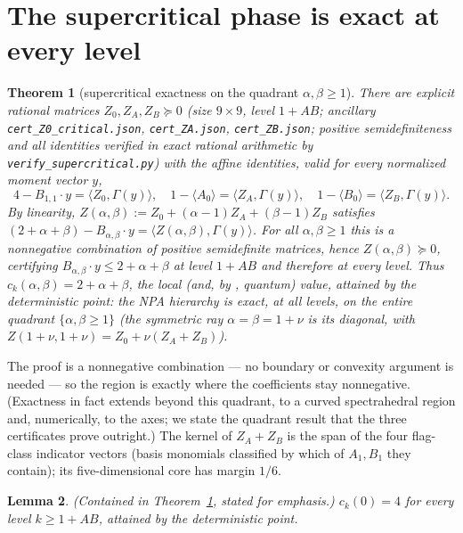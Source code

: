 \documentclass[11pt]{article}
\newtheorem{theorem}{Theorem}
\newtheorem{lemma}[theorem]{Lemma}
\begin{document}
\section{The supercritical phase is exact at every level}

\begin{theorem}[supercritical exactness on the quadrant $\alpha,\beta\ge1$]
\label{thm:super}
There are explicit rational matrices $Z_0,Z_A,Z_B\succeq0$ (size $9\times9$,
level $1{+}AB$; ancillary \texttt{cert\_Z0\_critical.json},
\texttt{cert\_ZA.json}, \texttt{cert\_ZB.json}; positive semidefiniteness and
all identities verified in exact rational arithmetic by
\texttt{verify\_supercritical.py}) with the affine identities, valid for every
normalized moment vector $y$,
\[
4-B_{1,1}\cdot y=\langle Z_0,\Gamma(y)\rangle,\quad
1-\langle A_0\rangle=\langle Z_A,\Gamma(y)\rangle,\quad
1-\langle B_0\rangle=\langle Z_B,\Gamma(y)\rangle .
\]
By linearity, $Z(\alpha,\beta):=Z_0+(\alpha-1)Z_A+(\beta-1)Z_B$ satisfies
$(2+\alpha+\beta)-B_{\alpha,\beta}\cdot y=\langle Z(\alpha,\beta),\Gamma(y)\rangle$.
For all $\alpha,\beta\ge1$ this is a \emph{nonnegative combination of positive
semidefinite matrices}, hence $Z(\alpha,\beta)\succeq0$, certifying
$B_{\alpha,\beta}\cdot y\le 2+\alpha+\beta$ at level $1{+}AB$ and therefore at
every level. Thus $c_k(\alpha,\beta)=2+\alpha+\beta$, the local (and, by
\cite{Gigena}, quantum) value, attained by the deterministic point: the NPA
hierarchy is exact, at all levels, on the entire quadrant $\{\alpha,\beta\ge1\}$
(the symmetric ray $\alpha=\beta=1+\nu$ is its diagonal, with
$Z(1{+}\nu,1{+}\nu)=Z_0+\nu(Z_A{+}Z_B)$).
\end{theorem}

The proof is a nonnegative combination --- no boundary or convexity argument is
needed --- so the region is exactly where the coefficients stay nonnegative.
(Exactness in fact extends beyond this quadrant, to a curved spectrahedral
region and, numerically, to the axes; we state the quadrant result that the three
certificates prove outright.) The kernel of $Z_A{+}Z_B$ is the span of the four
flag-class indicator vectors (basis monomials classified by which of $A_1,B_1$
they contain); its five-dimensional core has margin $1/6$.

\begin{lemma}\label{lem:z0}
(Contained in Theorem~\ref{thm:super}, stated for emphasis.) $c_k(0)=4$ for
every level $k\ge1{+}AB$, attained by the deterministic point.
\end{lemma}
\end{document}
